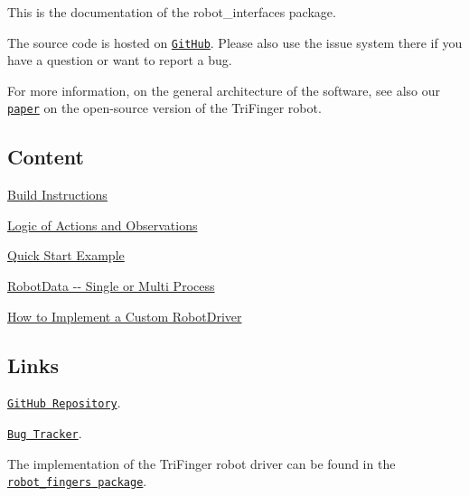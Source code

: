 This is the documentation of the {\ttfamily robot\+\_\+interfaces} package.

The source code is hosted on \href{https://github.com/open-dynamic-robot-initiative/robot_interfaces}{\tt Git\+Hub}. Please also use the issue system there if you have a question or want to report a bug.

For more information, on the general architecture of the software, see also our \href{https://arxiv.org/abs/2008.03596}{\tt paper} on the open-\/source version of the Tri\+Finger robot.

\subsection*{Content }


\begin{DoxyItemize}
\item \hyperlink{md_docs_installation}{Build Instructions}
\item \hyperlink{md_docs_timeseries}{Logic of Actions and Observations}
\item \hyperlink{md_docs_quick_start_example}{Quick Start Example}
\item \hyperlink{md_docs_robot_data}{Robot\+Data -\/-\/ Single or Multi Process}
\item \hyperlink{md_docs_custom_driver}{How to Implement a Custom Robot\+Driver}
\end{DoxyItemize}

\subsection*{Links }


\begin{DoxyItemize}
\item \href{https://github.com/open-dynamic-robot-initiative/robot_interfaces}{\tt Git\+Hub Repository}.
\item \href{https://github.com/open-dynamic-robot-initiative/robot_interfaces/issues}{\tt Bug Tracker}.
\item The implementation of the Tri\+Finger robot driver can be found in the \href{https://open-dynamic-robot-initiative.github.io/code_documentation/robot_fingers/docs/doxygen/html/index.html}{\tt {\ttfamily robot\+\_\+fingers} package}. 
\end{DoxyItemize}